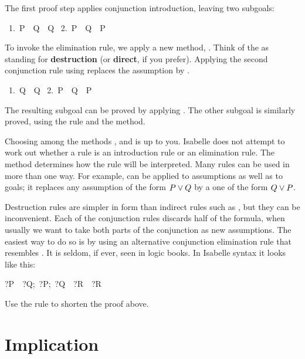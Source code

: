 The first proof step applies conjunction introduction, leaving 
two subgoals: 
\begin{isabelle}
\ 1.\ P\ \isasymand\ Q\ \isasymLongrightarrow\ Q\isanewline
\ 2.\ P\ \isasymand\ Q\ \isasymLongrightarrow\ P
\end{isabelle}

To invoke the elimination rule, we apply a new method, . 
Think of the  as standing for \textbf{destruction} (or \textbf{direct}, if
you prefer).   Applying the 
second conjunction rule using  replaces the assumption 
 by . 
\begin{isabelle}
\ 1.\ Q\ \isasymLongrightarrow\ Q\isanewline
\ 2.\ P\ \isasymand\ Q\ \isasymLongrightarrow\ P
\end{isabelle}
The resulting subgoal can be proved by applying .
The other subgoal is similarly proved, using the  rule and the 
 method.

Choosing among the methods ,  and  is up to 
you.  Isabelle does not attempt to work out whether a rule 
is an introduction rule or an elimination rule.  The 
method determines how the rule will be interpreted. Many rules 
can be used in more than one way.  For example,  can 
be applied to assumptions as well as to goals; it replaces any
assumption of the form
$P\vee Q$ by a one of the form $Q\vee P$.

Destruction rules are simpler in form than indirect rules such as ,
but they can be inconvenient.  Each of the conjunction rules discards half 
of the formula, when usually we want to take both parts of the conjunction as new
assumptions.  The easiest way to do so is by using an 
alternative conjunction elimination rule that resembles .  It is seldom,
if ever, seen in logic books.  In Isabelle syntax it looks like this: 
\begin{isabelle}
\isasymlbrakk?P\ \isasymand\ ?Q;\ \isasymlbrakk?P;\ ?Q\isasymrbrakk\ \isasymLongrightarrow\ ?R\isasymrbrakk\ \isasymLongrightarrow\ ?R
\end{isabelle}

\begin{exercise}
Use the rule {} to shorten the proof above. 
\end{exercise}


\section{Implication}

